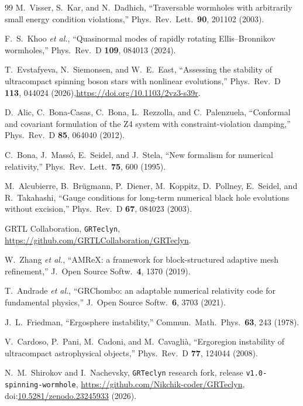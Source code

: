 \documentclass[twocolumn,floatfix,aps,prd,superscriptaddress,nofootinbib]{revtex4-2}
\begin{document}
\begin{thebibliography}{99}
M.~Visser, S.~Kar, and N.~Dadhich,
\newblock ``Traversable wormholes with arbitrarily small energy condition violations,''
\newblock Phys.\ Rev.\ Lett.\ \textbf{90}, 201102 (2003).

F.~S.~Khoo \emph{et al.},
\newblock ``Quasinormal modes of rapidly rotating Ellis--Bronnikov wormholes,''
\newblock Phys.\ Rev.\ D \textbf{109}, 084013 (2024).

T.~Evstafyeva, N.~Siemonsen, and W.~E.~East,
\newblock ``Assessing the stability of ultracompact spinning boson stars with nonlinear evolutions,''
\newblock Phys.\ Rev.\ D \textbf{113}, 044024 (2026),\quad\url{https://doi.org/10.1103/2vz3-s39r}.

D.~Alic, C.~Bona-Casas, C.~Bona, L.~Rezzolla, and C.~Palenzuela,
\newblock ``Conformal and covariant formulation of the Z4 system with constraint-violation damping,''
\newblock Phys.\ Rev.\ D \textbf{85}, 064040 (2012).

C.~Bona, J.~Mass\'o, E.~Seidel, and J.~Stela,
\newblock ``New formalism for numerical relativity,''
\newblock Phys.\ Rev.\ Lett.\ \textbf{75}, 600 (1995).

M.~Alcubierre, B.~Br\"ugmann, P.~Diener, M.~Koppitz, D.~Pollney, E.~Seidel, and R.~Takahashi,
\newblock ``Gauge conditions for long-term numerical black hole evolutions without excision,''
\newblock Phys.\ Rev.\ D \textbf{67}, 084023 (2003).

GRTL Collaboration,
\newblock \texttt{GRTeclyn},
\newblock \url{https://github.com/GRTLCollaboration/GRTeclyn}.

W.~Zhang \emph{et al.},
\newblock ``AMReX: a framework for block-structured adaptive mesh refinement,''
\newblock J.\ Open Source Softw.\ \textbf{4}, 1370 (2019).

T.~Andrade \emph{et al.},
\newblock ``GRChombo: an adaptable numerical relativity code for fundamental physics,''
\newblock J.\ Open Source Softw.\ \textbf{6}, 3703 (2021).

J.~L.~Friedman,
\newblock ``Ergosphere instability,''
\newblock Commun.\ Math.\ Phys.\ \textbf{63}, 243 (1978).

V.~Cardoso, P.~Pani, M.~Cadoni, and M.~Cavagli\`a,
\newblock ``Ergoregion instability of ultracompact astrophysical objects,''
\newblock Phys.\ Rev.\ D \textbf{77}, 124044 (2008).

N.~M.~Shirokov and I.~Nachevsky,
\newblock \texttt{GRTeclyn} research fork, release \texttt{v1.0-spinning-wormhole},
\newblock \url{https://github.com/Nikchik-coder/GRTeclyn},
\newblock doi:\href{https://doi.org/10.5281/zenodo.23245933}{10.5281/zenodo.23245933} (2026).

\end{thebibliography}
\end{document}
